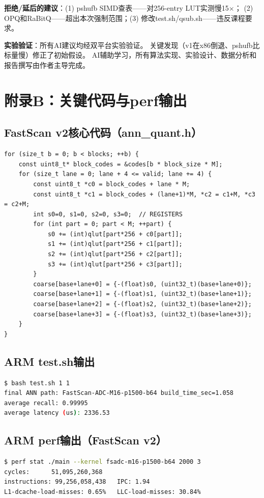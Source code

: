 \documentclass[11pt,a4paper]{article}
\begin{document}
\textbf{拒绝/延后的建议}：(1) pshufb SIMD查表——对256-entry LUT实测慢15$\times$；
(2) OPQ和RaBitQ——超出本次强制范围；(3) 修改test.sh/qsub.sh——违反课程要求。

\textbf{实验验证}：所有AI建议均经双平台实验验证。
关键发现（v1在x86倒退、pshufb比标量慢）修正了初始假设。
AI辅助学习，所有算法实现、实验设计、数据分析和报告撰写由作者主导完成。

\section{附录B：关键代码与perf输出}

\subsection{FastScan v2核心代码（ann\_quant.h）}
\begin{lstlisting}
for (size_t b = 0; b < blocks; ++b) {
    const uint8_t* block_codes = &codes[b * block_size * M];
    for (size_t lane = 0; lane + 4 <= valid; lane += 4) {
        const uint8_t *c0 = block_codes + lane * M;
        const uint8_t *c1 = block_codes + (lane+1)*M, *c2 = c1+M, *c3 = c2+M;
        int s0=0, s1=0, s2=0, s3=0;  // REGISTERS
        for (int part = 0; part < M; ++part) {
            s0 += (int)qlut[part*256 + c0[part]];
            s1 += (int)qlut[part*256 + c1[part]];
            s2 += (int)qlut[part*256 + c2[part]];
            s3 += (int)qlut[part*256 + c3[part]];
        }
        coarse[base+lane+0] = {-(float)s0, (uint32_t)(base+lane+0)};
        coarse[base+lane+1] = {-(float)s1, (uint32_t)(base+lane+1)};
        coarse[base+lane+2] = {-(float)s2, (uint32_t)(base+lane+2)};
        coarse[base+lane+3] = {-(float)s3, (uint32_t)(base+lane+3)};
    }
}
\end{lstlisting}

\subsection{ARM test.sh输出}
\begin{lstlisting}[language=bash,numbers=none]
$ bash test.sh 1 1
final ANN path: FastScan-ADC-M16-p1500-b64 build_time_sec=1.058
average recall: 0.99995
average latency (us): 2336.53
\end{lstlisting}

\subsection{ARM perf输出（FastScan v2）}
\begin{lstlisting}[language=bash,numbers=none]
$ perf stat ./main --kernel fsadc-m16-p1500-b64 2000 3
cycles:      51,095,260,368
instructions: 99,256,058,438   IPC: 1.94
L1-dcache-load-misses: 0.65%   LLC-load-misses: 30.84%
\end{lstlisting}
\end{document}
